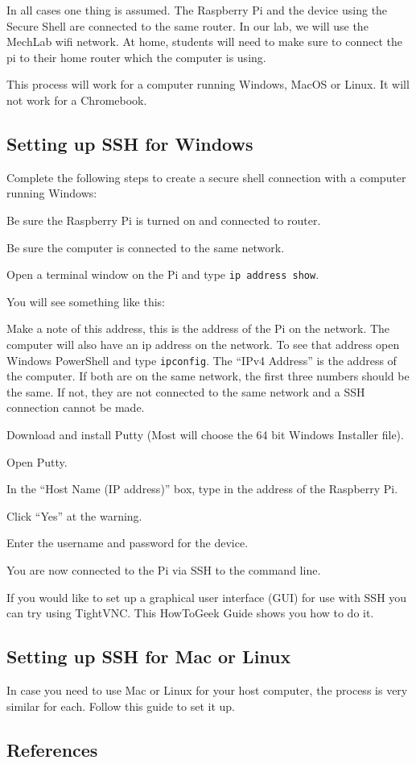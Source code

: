 \documentclass[
]{book}
\begin{document}
In all cases one thing is assumed. The Raspberry Pi and the device using the Secure Shell are connected to the same router. In our lab, we will use the MechLab wifi network. At home, students will need to make sure to connect the pi to their home router which the computer is using.

This process will work for a computer running Windows, MacOS or Linux. It will not work for a Chromebook.

\hypertarget{setting-up-ssh-for-windows}{%
\subsection{Setting up SSH for Windows}\label{setting-up-ssh-for-windows}}

Complete the following steps to create a secure shell connection with a computer running Windows:

Be sure the Raspberry Pi is turned on and connected to router.

Be sure the computer is connected to the same network.

Open a terminal window on the Pi and type \texttt{ip\ address\ show}.

You will see something like this:

Make a note of this address, this is the address of the Pi on the network. The computer will also have an ip address on the network. To see that address open Windows PowerShell and type \texttt{ipconfig}. The ``IPv4 Address'' is the address of the computer. If both are on the same network, the first three numbers should be the same. If not, they are not connected to the same network and a SSH connection cannot be made.

Download and install Putty (Most will choose the 64 bit Windows Installer file).

Open Putty.

In the ``Host Name (IP address)'' box, type in the address of the Raspberry Pi.

Click ``Yes'' at the warning.

Enter the username and password for the device.

You are now connected to the Pi via SSH to the command line.

If you would like to set up a graphical user interface (GUI) for use with SSH you can try using TightVNC. This HowToGeek Guide shows you how to do it.

\hypertarget{setting-up-ssh-for-mac-or-linux}{%
\subsection{Setting up SSH for Mac or Linux}\label{setting-up-ssh-for-mac-or-linux}}

In case you need to use Mac or Linux for your host computer, the process is very similar for each. Follow this guide to set it up.

\hypertarget{references}{%
\subsection{References}\label{references}}

  
\end{document}

